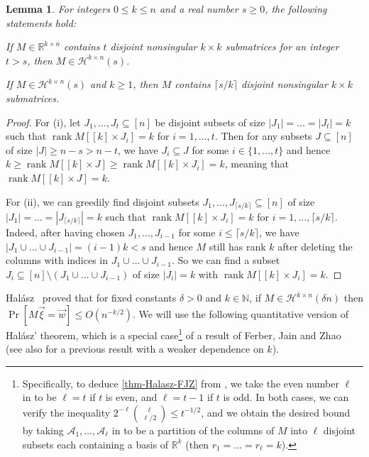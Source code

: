 \documentclass[english]{article}
\newtheorem{lemma}[theorem]{Lemma}
\theoremstyle{remark}
\numberwithin{equation}{section}
\numberwithin{figure}{section}
\newcommand{\su}{\subseteq}
\newcommand{\sm}{\setminus}
\newcommand{\RR}{\mathbb{R}}
\newcommand{\mb}{\mathbb}
\newcommand{\on}{\operatorname}
\begin{document}
\begin{lemma}\label{lem-halasz-equivalent}
For integers $0\le k\le n$ and a real number $s\ge 0$, the following statements hold:
\begin{compactitem}
\item[(i)] If $M\in \RR^{k\times n}$ contains $t$ disjoint nonsingular $k\times k$ submatrices for an integer $t>s$, then $M\in \mathcal{H}^{k\times n}(s)$.
\item[(ii)] If $M\in \mathcal{H}^{k\times n}(s)$ and $k\ge 1$, then $M$ contains $\lceil s/k\rceil$ disjoint nonsingular $k\times k$ submatrices.
\end{compactitem}
\end{lemma}
\begin{proof}
    For (i), let $J_1,\dots, J_t\su [n]$ be disjoint subsets of size $|J_1|=\dots=|J_t|=k$ such that $\on{rank} M[[k]\times J_i]=k$ for $i=1,\dots,t$. Then for any subsets $J\su [n]$ of size $|J|\ge n-s>n-t$, we have $J_i\su J$ for some $i\in \{1,\dots,t\}$ and hence $k\ge \on{rank} M[[k]\times J]\ge \on{rank} M[[k]\times J_i]=k$, meaning that $\on{rank} M[[k]\times J]=k$.

    For (ii), we can greedily find disjoint subsets $J_1,\dots, J_{\lceil s/k\rceil}\su [n]$ of size $|J_1|=\dots=|J_{\lceil s/k\rceil}|=k$ such that $\on{rank} M[[k]\times J_i]=k$ for $i=1,\dots,\lceil s/k\rceil$. Indeed, after having chosen $J_1,\dots, J_{i-1}$ for some $i\le \lceil s/k\rceil$, we have $|J_1\cup \dots\cup J_{i-1}|=(i-1)k<s$ and hence $M$ still has rank $k$ after deleting the columns with indices in $J_1\cup \dots\cup J_{i-1}$. So we can find a subset $J_i\su [n]\sm (J_1\cup \dots\cup J_{i-1})$ of size $|J_i|=k$ with $\on{rank} M[[k]\times J_i]=k$.
\end{proof}

Hal\'asz~\cite{Hal77} proved that for fixed constants $\delta>0$ and $k\in \mb{N}$, if $M\in \mathcal{H}^{k\times n}(\delta n)$ then $\Pr[M\vec \xi=\vec w]\le O(n^{-k/2})$. We will use the following quantitative version of Hal\'asz' theorem, which is a special case\footnote{Specifically, to deduce \cref{thm-Halasz-FJZ} from \cite[Theorem 1.11]{FJZ22}, we take the even number $\ell$ in \cite[Theorem 1.11]{FJZ22} to be $\ell=t$ if $t$ is even, and $\ell=t-1$ if $t$ is odd. In both cases, we can verify the inequality $2^{-\ell}\binom{\ell}{\ell/2}\le t^{-1/2}$, and we obtain the desired bound by taking $\mathcal{A}_1,\dots,\mathcal{A}_\ell$ in \cite[Theorem 1.11]{FJZ22} to be a partition of the columns of $M$ into $\ell$ disjoint subsets each containing a basis of $\RR^k$ (then $r_1=\dots=r_{\ell}=k$).} of a result of Ferber, Jain and Zhao~\cite[Theorem 1.11]{FJZ22} (see also \cite{HO} for a previous result with a weaker dependence on $k$).
\end{document}
